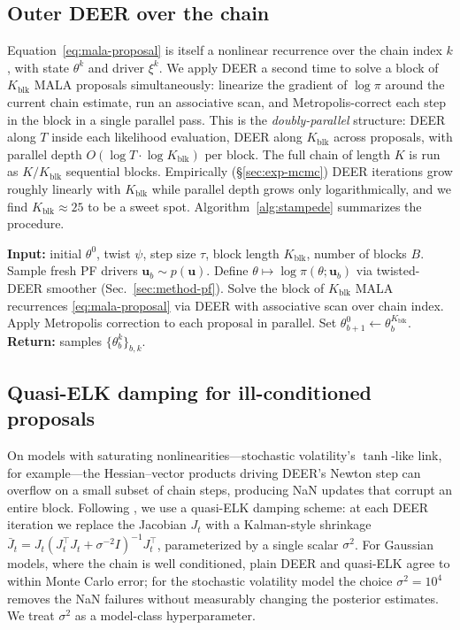 \documentclass{article}
\begin{document}
\subsection{Outer DEER over the chain}
\label{sec:outer-deer}
Equation~\eqref{eq:mala-proposal} is itself a nonlinear recurrence over the chain index $k$, with state $\theta^k$ and driver $\xi^k$. We apply DEER a second time to solve a block of $K_{\text{blk}}$ MALA proposals simultaneously: linearize the gradient of $\log \pi$ around the current chain estimate, run an associative scan, and Metropolis-correct each step in the block in a single parallel pass. This is the \emph{doubly-parallel} structure: DEER along $T$ inside each likelihood evaluation, DEER along $K_{\text{blk}}$ across proposals, with parallel depth $O(\log T \cdot \log K_{\text{blk}})$ per block. The full chain of length $K$ is run as $K / K_{\text{blk}}$ sequential blocks. Empirically (\S\ref{sec:exp-mcmc}) DEER iterations grow roughly linearly with $K_{\text{blk}}$ while parallel depth grows only logarithmically, and we find $K_{\text{blk}} \approx 25$ to be a sweet spot. Algorithm~\ref{alg:stampede} summarizes the procedure.

\begin{algorithm}[t]
\caption{STAMPEDE: doubly-parallel particle MCMC}
\label{alg:stampede}
\begin{algorithmic}[1]
\STATE \textbf{Input:} initial $\theta^0$, twist $\psi$, step size $\tau$, block length $K_{\text{blk}}$, number of blocks $B$.
    \STATE Sample fresh PF drivers $\mathbf{u}_b \sim p(\mathbf{u})$.
    \STATE Define $\theta \mapsto \log \pi(\theta; \mathbf{u}_b)$ via twisted-DEER smoother (Sec.~\ref{sec:method-pf}).
    \STATE Solve the block of $K_{\text{blk}}$ MALA recurrences \eqref{eq:mala-proposal} via DEER with associative scan over chain index.
    \STATE Apply Metropolis correction to each proposal in parallel.
    \STATE Set $\theta^{0}_{b+1} \leftarrow \theta^{K_{\text{blk}}}_{b}$.
\ENDFOR
\STATE \textbf{Return:} samples $\{\theta^{k}_{b}\}_{b,k}$.
\end{algorithmic}
\end{algorithm}

\subsection{Quasi-ELK damping for ill-conditioned proposals}
\label{sec:quasi-elk}
On models with saturating nonlinearities---stochastic volatility's $\tanh$-like link, for example---the Hessian--vector products driving DEER's Newton step can overflow on a small subset of chain steps, producing NaN updates that corrupt an entire block. Following \citet{gonzalez2024towards}, we use a quasi-ELK damping scheme: at each DEER iteration we replace the Jacobian $J_t$ with a Kalman-style shrinkage $\bar{J}_t = J_t (J_t^\top J_t + \sigma^{-2} I)^{-1} J_t^\top$, parameterized by a single scalar $\sigma^2$. For Gaussian models, where the chain is well conditioned, plain DEER and quasi-ELK agree to within Monte Carlo error; for the stochastic volatility model the choice $\sigma^2 = 10^4$ removes the NaN failures without measurably changing the posterior estimates. We treat $\sigma^2$ as a model-class hyperparameter.
\end{document}
